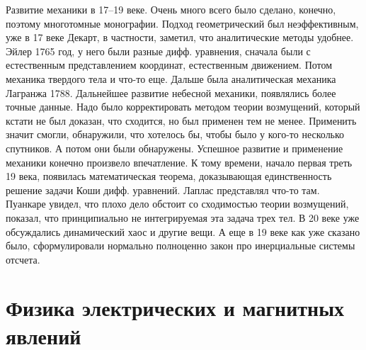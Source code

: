 \documentclass[a4paper, 12pt]{article}
\begin{document}
Развитие механики в 17--19 веке. Очень много всего было сделано, 
конечно, поэтому многотомные монографии. Подход геометрический был 
неэффективным, уже в 17 веке Декарт, в частности, заметил, что 
аналитические методы удобнее. Эйлер 1765 год, у него были разные дифф. 
уравнения, сначала были с естественным представлением координат, 
естественным движением. Потом механика твердого тела и что-то еще. 
Дальше была аналитическая механика Лагранжа 1788. Дальнейшее развитие 
небесной механики, появлялись более точные данные. Надо было 
корректировать методом теории возмущений, который кстати не был доказан, 
что сходится, но был применен тем не менее. Применить значит смогли, 
обнаружили, что хотелось бы, чтобы было у кого-то несколько спутников. 
А потом они были обнаружены. Успешное развитие и применение механики 
конечно произвело впечатление. К тому времени, начало первая треть 19 
века, появилась математическая теорема, доказывающая единственность 
решение задачи Коши дифф. уравнений. Лаплас представлял что-то там. 
Пуанкаре увидел, что плохо дело обстоит со сходимостью теории 
возмущений, показал, что принципиально не интегрируемая эта задача трех 
тел. В 20 веке уже обсуждались динамический хаос и другие вещи. А еще 
в 19 веке как уже сказано было, сформулировали нормально полноценно 
закон про инерциальные системы отсчета.


\section{Физика электрических и магнитных явлений}
\end{document}
